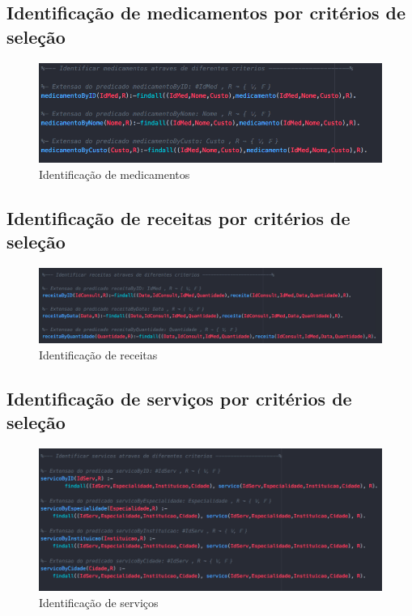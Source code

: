 \documentclass[25pt]{article}
\begin{document}
\subsection{Identificação de medicamentos por critérios de seleção}
\begin{figure}[H]
\centering\includegraphics[scale=0.5]{medicamento}
\caption{\label{fig:controller}Identificação de medicamentos}
\end{figure}


\subsection{Identificação de receitas por critérios de seleção}
\begin{figure}[H]
\centering\includegraphics[scale=0.45]{receita}
\caption{\label{fig:controller}Identificação de receitas}
\end{figure}
\subsection{Identificação de serviços por critérios de seleção}
\begin{figure}[H]
\centering\includegraphics[scale=0.5]{criterioservico}
\caption{\label{fig:controller}Identificação de serviços}
\end{figure}
\end{document}
